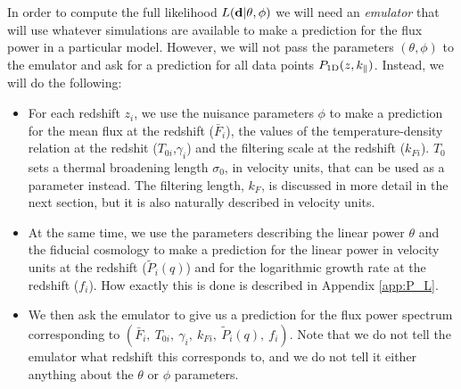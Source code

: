 In order to compute the full likelihood $L(\mathbf{d} | \theta, \phi)$ we will
need an \textit{emulator} that will use whatever simulations are available
to make a prediction for the flux power in a particular model.
However, we will not pass the parameters $(\theta,\phi)$ to the emulator
and ask for a prediction for all data points $P_{\rm 1D}(z,k_\parallel)$.
Instead, we will do the following:
\begin{itemize}
 \item For each redshift $z_i$, we use the nuisance parameters $\phi$ to
  make a prediction for the mean flux at the redshift ($\bar F_i$), the
  values of the temperature-density relation at the redshit 
  ($T_{0i}$,$\gamma_i$) and the filtering scale at the redshift ($k_{Fi}$).
  $T_0$ sets a thermal broadening length $\sigma_0$, in velocity units,
  that can be used as a parameter instead.
  The filtering length, $k_F$, is discussed in more detail in the next
  section, but it is also naturally described in velocity units.
 \item At the same time, we use the parameters describing the linear power
  $\theta$ and the fiducial cosmology to make a prediction for the linear
  power in velocity units at the redshift ($\tilde P_i(q)$) and for the
  logarithmic growth rate at the redshift ($f_i$).
  How exactly this is done is described in Appendix \ref{app:P_L}.
 \item We then ask the emulator to give us a prediction for the flux power
  spectrum corresponding to 
  $\left( \bar F_i,~T_{0i},~\gamma_i,~k_{Fi},~\tilde P_i(q),~f_i \right)$.
  Note that we do not tell the emulator what redshift this corresponds to,
  and we do not tell it either anything about the $\theta$ or $\phi$
  parameters.
\end{itemize}

